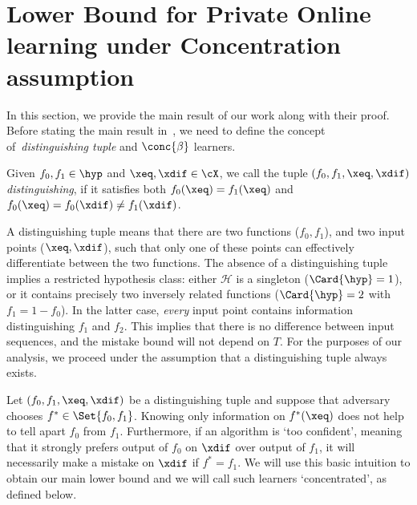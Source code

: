\section[Lower bound under concentration assumption]{Lower Bound for Private Online learning under Concentration assumption}
\label{sec:main}

In this section, we provide the main result of our work along with their proof. Before stating the main result in~, we need to define the concept of~\emph{distinguishing tuple} and \(\conc{\beta}\) learners.



\begin{definition}\label{defn:dist-tuple}
    Given \(f_0, f_1 \in \hyp\) and \(\xeq, \xdif \in \cX\), we call the tuple \((f_0, f_1, \xeq, \xdif)\) \emph{distinguishing},
    if  it satisfies both \(f_0(\xeq) = f_1(\xeq)\) and \(f_0(\xeq) = f_0(\xdif) \neq f_1(\xdif)\).
\end{definition}
A distinguishing tuple means that there are two functions (\(f_0, f_1\)), and two input points (\(\xeq, \xdif\)), such that only one of these points can effectively differentiate between the two functions. 
The absence of a distinguishing tuple implies a restricted hypothesis class: either \(\mathcal{H}\) is a singleton (\(\Card{\hyp} = 1\)), or it contains precisely two inversely related functions (\(\Card{\hyp} = 2\) with \(f_1 = 1 - f_0\)). In the latter case, \emph{every} input point contains information distinguishing \(f_1\) and \(f_2\).
This implies that there is no difference between input sequences, and the mistake bound will not depend on \(T\). For the purposes of our analysis, we proceed under the assumption that a distinguishing tuple always exists.


Let \((f_0, f_1, \xeq, \xdif)\) be a distinguishing tuple and suppose that adversary chooses \(f^{\ast} \in \Set{f_0, f_1}\).
Knowing only information on \(f^{\ast}(\xeq)\) does not help to tell apart \(f_0\) from \(f_1\).
Furthermore, if an algorithm is `too confident', meaning that it strongly prefers output of \(f_0\) on \(\xdif\) over output of \(f_1\), 
it will necessarily make a mistake on \(\xdif\) if \(f^{\ast} = f_1\). We will use this basic intuition to obtain our main lower bound and we will call such learners `concentrated', as defined below.

